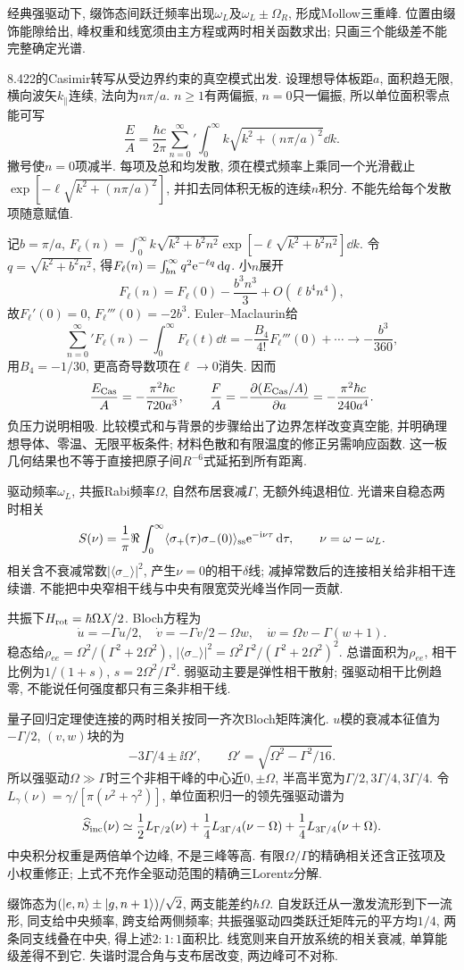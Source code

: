 经典强驱动下, 缀饰态间跃迁频率出现$\omega_L$及$\omega_L\pm\Omega_R$, 形成Mollow三重峰. 位置由缀饰能隙给出, 峰权重和线宽须由主方程或两时相关函数求出; 只画三个能级差不能完整确定光谱.

8.422的Casimir转写从受边界约束的真空模式出发. 设理想导体板距$a$, 面积趋无限, 横向波矢$k_\parallel$连续, 法向为$n\pi/a$. $n\ge1$有两偏振, $n=0$只一偏振, 所以单位面积零点能可写
\[\frac EA=\frac{\hbar c}{2\pi}\sum_{n=0}^{\infty}{}'
 \int_0^\infty k\sqrt{k^2+(n\pi/a)^2}\dd k.\]
撇号使$n=0$项减半. 每项及总和均发散, 须在模式频率上乘同一个光滑截止$\exp[-\ell\sqrt{k^2+(n\pi/a)^2}]$, 并扣去同体积无板的连续$n$积分. 不能先给每个发散项随意赋值.

记$b=\pi/a$, $F_\ell(n)=\int_0^\infty k\sqrt{k^2+b^2n^2}\exp[-\ell\sqrt{k^2+b^2n^2}]\dd k$. 令$q=\sqrt{k^2+b^2n^2}$, 得$F_\ell(n)=\int_{bn}^\infty q^2\mathrm e^{-\ell q}\,\mathrm d q$. 小$n$展开
\[F_\ell(n)=F_\ell(0)-\frac{b^3n^3}{3}+O(\ell b^4n^4),\]
故$F_\ell'(0)=0$, $F_\ell'''(0)=-2b^3$. Euler--Maclaurin给
\[\sum_{n=0}^\infty{}'F_\ell(n)-\int_0^\infty F_\ell(t)\dd t
 =-\frac{B_4}{4!}F_\ell'''(0)+\cdots
 \longrightarrow-\frac{b^3}{360},\]
用$B_4=-1/30$, 更高奇导数项在$\ell\to0$消失. 因而
\[\frac{E_{\rm Cas}}A=-\frac{\pi^2\hbar c}{720a^3},\qquad
 \frac FA=-\frac{\partial(E_{\rm Cas}/A)}{\partial a}
 =-\frac{\pi^2\hbar c}{240a^4}.\]
负压力说明相吸. 比较模式和与背景的步骤给出了边界怎样改变真空能, 并明确理想导体、零温、无限平板条件; 材料色散和有限温度的修正另需响应函数. 这一板几何结果也不等于直接把原子间$R^{-6}$式延拓到所有距离.

驱动频率$\omega_L$, 共振Rabi频率$\Omega$, 自然布居衰减$\Gamma$, 无额外纯退相位. 光谱来自稳态两时相关
\[S(\nu)=\frac1\pi\Re\int_0^\infty
 \langle\sigma_+(\tau)\sigma_-(0)\rangle_{\rm ss}\mathrm e^{-\mathrm i\nu\tau}\,\mathrm d\tau,
 \qquad \nu=\omega-\omega_L.\]
相关含不衰减常数$|\langle\sigma_-\rangle|^2$, 产生$\nu=0$的相干$\delta$线; 减掉常数后的连接相关给非相干连续谱. 不能把中央窄相干线与中央有限宽荧光峰当作同一贡献.

共振下$H_{\rm rot}=\hbar\Omega X/2$. Bloch方程为
\[\dot u=-\Gamma u/2,\quad
 \dot v=-\Gamma v/2-\Omega w,\quad
 \dot w=\Omega v-\Gamma(w+1).\]
稳态给$\rho_{ee}=\Omega^2/(\Gamma^2+2\Omega^2)$,
$|\langle\sigma_-\rangle|^2=\Omega^2\Gamma^2/(\Gamma^2+2\Omega^2)^2$.
总谱面积为$\rho_{ee}$, 相干比例为$1/(1+s)$, $s=2\Omega^2/\Gamma^2$. 弱驱动主要是弹性相干散射; 强驱动相干比例趋零, 不能说任何强度都只有三条非相干线.

量子回归定理使连接的两时相关按同一齐次Bloch矩阵演化. $u$模的衰减本征值为$-\Gamma/2$, $(v,w)$块的为
\[-3\Gamma/4\pm\ii\Omega',\qquad
 \Omega'=\sqrt{\Omega^2-\Gamma^2/16}.\]
所以强驱动$\Omega\gg\Gamma$时三个非相干峰的中心近$0,\pm\Omega$, 半高半宽为$\Gamma/2,3\Gamma/4,3\Gamma/4$. 令$L_\gamma(\nu)=\gamma/[\pi(\nu^2+\gamma^2)]$, 单位面积归一的领先强驱动谱为
\[\widehat S_{\rm inc}(\nu)\simeq
 \frac12L_{\Gamma/2}(\nu)+
 \frac14L_{3\Gamma/4}(\nu-\Omega)+
 \frac14L_{3\Gamma/4}(\nu+\Omega).\]
中央积分权重是两倍单个边峰, 不是三峰等高. 有限$\Omega/\Gamma$的精确相关还含正弦项及小权重修正; 上式不充作全驱动范围的精确三Lorentz分解.

缀饰态为$(\lvert e,n\rangle\pm\lvert g,n+1\rangle)/\sqrt2$, 两支能差约$\hbar\Omega$. 自发跃迁从一激发流形到下一流形, 同支给中央频率, 跨支给两侧频率; 共振强驱动四类跃迁矩阵元的平方均$1/4$, 两条同支线叠在中央, 得上述$2:1:1$面积比. 线宽则来自开放系统的相关衰减, 单算能级差得不到它. 失谐时混合角与支布居改变, 两边峰可不对称.
